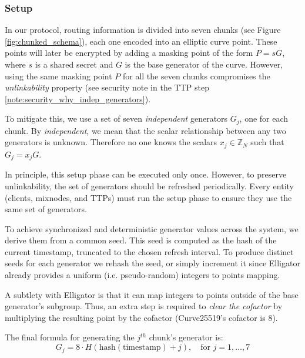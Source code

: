 \subsubsection{Setup}

In our protocol, routing information is divided into seven chunks (see Figure \ref{fig:chunked_schema}), each one encoded into an elliptic curve point. 
These points will later be encrypted by adding a masking point of the form $ P = s G $, where $ s $ is a shared secret and $ G $ is the base generator of the curve.
However, using the same masking point $ P $ for all the seven chunks compromises the \textit{unlinkability} property
(see security note in the TTP step \ref{note:security_why_indep_generators}).

To mitigate this, we use a set of seven \textit{independent} generators $ G_j $, one for each chunk. 
By \textit{independent}, we mean that the scalar relationship between any two generators is unknown. 
Therefore no one knows the scalars $ x_j \in \mathbb{Z}_N $ such that $ G_j = x_j G $.

In principle, this setup phase can be executed only once. 
However, to preserve unlinkability, the set of generators should be refreshed periodically. 
Every entity (clients, mixnodes, and TTPs) must run the setup phase to ensure they use the same set of generators.

To achieve synchronized and deterministic generator values across the system, we derive them from a common seed. 
This seed is computed as the hash of the current timestamp, truncated to the chosen refresh interval. 
To produce distinct seeds for each generator we rehash the seed, or simply increment it since Elligator already provides a uniform (i.e. pseudo-random) integers to points mapping.

A subtlety with Elligator is that it can map integers to points outside of the base generator's subgroup.
Thus, an extra step is required to \textit{clear the cofactor} by multiplying the resulting point by the cofactor (Curve25519's cofactor is $ 8 $).

\noindent The final formula for generating the $ j^{th} $ chunk’s generator is:
\begin{equation}
G_j = 8 \cdot H(\text{hash}(\text{timestamp}) + j), \quad \text{for } j = 1, \dots, 7
\end{equation}



